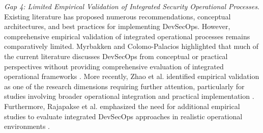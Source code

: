 \textit{Gap 4: Limited Empirical Validation of Integrated Security Operational Processes}.
Existing literature has proposed numerous recommendations, conceptual architectures, and best practices for implementing DevSecOps. However, comprehensive empirical validation of integrated operational processes remains comparatively limited. Myrbakken and Colomo-Palacios highlighted that much of the current literature discusses DevSecOps from conceptual or practical perspectives without providing comprehensive evaluation of integrated operational frameworks \cite{Myrbakken2017DevSecOps}. More recently, Zhao et al. identified empirical validation as one of the research dimensions requiring further attention, particularly for studies involving broader operational integration and practical implementation \cite{Zhao2024DevSecOpsMLR}. Furthermore, Rajapakse et al. emphasized the need for additional empirical studies to evaluate integrated DevSecOps approaches in realistic operational environments \cite{Rajapakse2021DevSecOpsSLR}.